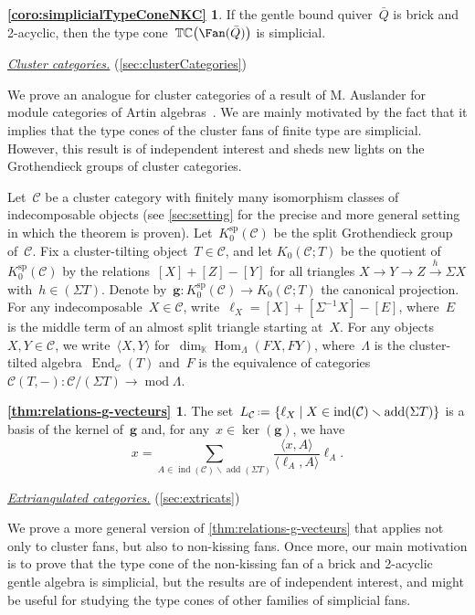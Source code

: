 \documentclass{amsart}
\theoremstyle{definition}
\renewcommand{\b}[1]{{\boldsymbol{#1}}} %
\newcommand{\set}[2]{\left\{ #1 \;\middle|\; #2 \right\}} %
\newcommand{\ssm}{\smallsetminus} %
\newcommand{\eqdef}{\mbox{\,\raisebox{0.2ex}{\scriptsize\ensuremath{\mathrm:}}\ensuremath{=}\,}} %
\newcommand{\para}[1]{\medskip\noindent\uline{\textit{#1.}}} %
\newcommand{\typeCone}{\mathbb{TC}} %
\newcommand{\quiver}{\bar Q} %
\newcommand{\field}{\mathbb{K}}
\newcommand{\cat}{\mathcal{C}}
\newcommand{\Hom}[1]{\operatorname{Hom}_{#1}}
\newcommand{\susp}{\Sigma}
\newcommand{\add}{\operatorname{add}}
\newcommand{\MOD}{\operatorname{mod}}
\newcommand{\End}[1]{\operatorname{End}_{#1}}
\newcommand{\spl}{\operatorname{sp}}
\newcommand{\Ksp}{K_0^{\spl}}
\newcommand{\ind}{\operatorname{ind}}
\begin{document}
\newtheorem*{coro:simplicialTypeConeNKC}{\cref{coro:simplicialTypeConeNKC}}
\begin{coro:simplicialTypeConeNKC}
If the gentle bound quiver~$\quiver$ is brick and 2-acyclic, then the type cone~$\typeCone \big( \Fan(\quiver) \big)$ is simplicial.
\end{coro:simplicialTypeConeNKC}


\para{Cluster categories}
(\cref{sec:clusterCategories})

\noindent
We prove an analogue for cluster categories of a result of M. Auslander for module categories of Artin algebras~\cite{Auslander1984}. 
We are mainly motivated by the fact that it implies that the type cones of the cluster fans of finite type are simplicial.
However, this result is of independent interest and sheds new lights on the Grothendieck groups of cluster categories.

Let~$\cat$ be a cluster category with finitely many isomorphism classes of indecomposable objects (see \cref{sec:setting} for the precise and more general setting in which the theorem is proven).
Let~$\Ksp(\cat)$ be the split Grothendieck group of~$\cat$.
Fix a cluster-tilting object~$T\in\cat$, and let $K_0(\cat ; T)$ be the quotient of~$\Ksp(\cat)$ by the relations~$[X]+[Z]-[Y]$ for all triangles ${X\xrightarrow{} Y \xrightarrow{} Z \xrightarrow{h} \susp X}$ with~$h \in (\susp T)$.
Denote by~$\b{g}:\Ksp(\cat) \to K_0(\cat ; T)$ the canonical projection.
For any indecomposable~$X\in\cat$, write~$\ell_X = [X]+[\susp^{-1}X]-[E]$, where~$E$ is the middle term of an almost split triangle starting at~$X$.
For any objects~$X,Y\in\cat$, we write~$\langle X, Y \rangle$ for~$\dim_\field\Hom{\Lambda}(FX,FY)$, where~$\Lambda$ is the cluster-tilted algebra~$\End{\cat}(T)$ and~$F$ is the equivalence of categories~$\cat(T,-):\cat/(\susp T) \to \MOD \Lambda$.

\newtheorem*{thm:relations-g-vecteurs}{\cref{thm:relations-g-vecteurs}}
\begin{thm:relations-g-vecteurs}
The set~$L_\cat \eqdef \set{\ell_X}{X \in \ind(\cat) \ssm \add(\susp T)}$ is a basis of the kernel of~$\b{g}$ and, for any~$x \in \ker(\b{g})$, we have
\[
x = \sum_{A \in \ind(\cat) \ssm \add(\susp T)} \frac{\langle x, A \rangle}{\langle \ell_A, A \rangle} \ell_A.
\]
\end{thm:relations-g-vecteurs}

\para{Extriangulated categories}
(\cref{sec:extricats})

\noindent
We prove a more general version of \cref{thm:relations-g-vecteurs} that applies not only to cluster fans, but also to non-kissing fans.
Once more, our main motivation is to prove that the type cone of the non-kissing fan of a brick and 2-acyclic gentle algebra is simplicial, but the results are of independent interest, and might be useful for studying the type cones of other families of simplicial fans.
\end{document}
